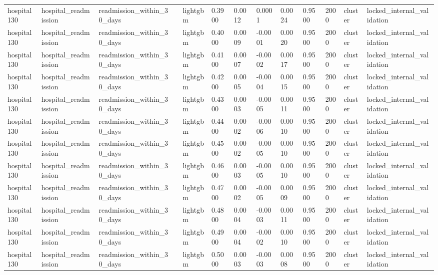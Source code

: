 \begin{tabular}{lllllllllllll}
hospital130 & hospital\_readmission & readmission\_within\_30\_days &  & lightgbm & 0.3900 & 0.0012 & 0.0001 & 0.0024 & 0.9500 & 2000 & cluster & locked\_internal\_validation \\
hospital130 & hospital\_readmission & readmission\_within\_30\_days &  & lightgbm & 0.4000 & 0.0009 & -0.0001 & 0.0020 & 0.9500 & 2000 & cluster & locked\_internal\_validation \\
hospital130 & hospital\_readmission & readmission\_within\_30\_days &  & lightgbm & 0.4100 & 0.0007 & -0.0002 & 0.0017 & 0.9500 & 2000 & cluster & locked\_internal\_validation \\
hospital130 & hospital\_readmission & readmission\_within\_30\_days &  & lightgbm & 0.4200 & 0.0005 & -0.0004 & 0.0015 & 0.9500 & 2000 & cluster & locked\_internal\_validation \\
hospital130 & hospital\_readmission & readmission\_within\_30\_days &  & lightgbm & 0.4300 & 0.0003 & -0.0005 & 0.0011 & 0.9500 & 2000 & cluster & locked\_internal\_validation \\
hospital130 & hospital\_readmission & readmission\_within\_30\_days &  & lightgbm & 0.4400 & 0.0002 & -0.0006 & 0.0010 & 0.9500 & 2000 & cluster & locked\_internal\_validation \\
hospital130 & hospital\_readmission & readmission\_within\_30\_days &  & lightgbm & 0.4500 & 0.0002 & -0.0005 & 0.0010 & 0.9500 & 2000 & cluster & locked\_internal\_validation \\
hospital130 & hospital\_readmission & readmission\_within\_30\_days &  & lightgbm & 0.4600 & 0.0003 & -0.0005 & 0.0010 & 0.9500 & 2000 & cluster & locked\_internal\_validation \\
hospital130 & hospital\_readmission & readmission\_within\_30\_days &  & lightgbm & 0.4700 & 0.0002 & -0.0005 & 0.0009 & 0.9500 & 2000 & cluster & locked\_internal\_validation \\
hospital130 & hospital\_readmission & readmission\_within\_30\_days &  & lightgbm & 0.4800 & 0.0004 & -0.0003 & 0.0011 & 0.9500 & 2000 & cluster & locked\_internal\_validation \\
hospital130 & hospital\_readmission & readmission\_within\_30\_days &  & lightgbm & 0.4900 & 0.0004 & -0.0002 & 0.0010 & 0.9500 & 2000 & cluster & locked\_internal\_validation \\
hospital130 & hospital\_readmission & readmission\_within\_30\_days &  & lightgbm & 0.5000 & 0.0003 & -0.0003 & 0.0008 & 0.9500 & 2000 & cluster & locked\_internal\_validation \\

\end{tabular}
